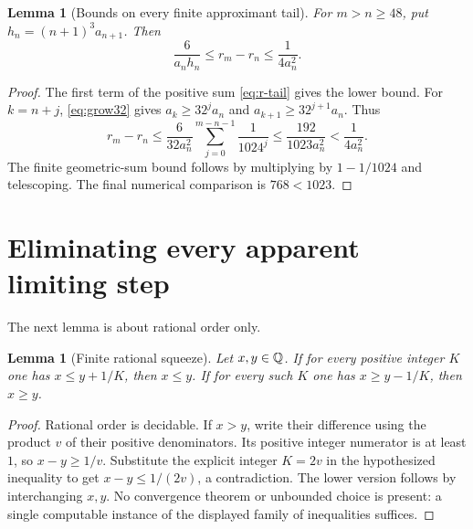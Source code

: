 \documentclass[11pt]{article}
\newtheorem{lemma}[theorem]{Lemma}
\theoremstyle{definition}\newtheorem{definition}[theorem]{Definition}
\theoremstyle{remark}\newtheorem{remark}[theorem]{Remark}
\begin{document}
\begin{lemma}[Bounds on every finite approximant tail]\label{lem:finite-tail}
For $m>n\ge48$, put $h_n=(n+1)^3a_{n+1}$. Then
\begin{equation}\label{eq:finite-tail-bounds}
 \frac6{a_nh_n}\le r_m-r_n\le\frac1{4a_n^2}.
\end{equation}
\end{lemma}
\begin{proof}
The first term of the positive sum \eqref{eq:r-tail} gives the lower bound.
For $k=n+j$, \eqref{eq:grow32} gives
$a_k\ge32^ja_n$ and $a_{k+1}\ge32^{j+1}a_n$. Thus
\[
 r_m-r_n
 \le\frac6{32a_n^2}\sum_{j=0}^{m-n-1}\frac1{1024^j}
 \le\frac{192}{1023a_n^2}<\frac1{4a_n^2}.
\]
The finite geometric-sum bound follows by multiplying by $1-1/1024$ and
telescoping. The final numerical comparison is $768<1023$.
\end{proof}

\section{Eliminating every apparent limiting step}\label{sec:squeeze}
The next lemma is about rational order only.

\begin{lemma}[Finite rational squeeze]\label{lem:squeeze}
Let $x,y\in\mathbb Q$. If for every positive integer $K$ one has
$x\le y+1/K$, then $x\le y$. If for every such $K$ one has
$x\ge y-1/K$, then $x\ge y$.
\end{lemma}
\begin{proof}
Rational order is decidable. If $x>y$, write their difference using the
product $v$ of their positive denominators. Its positive integer numerator
is at least $1$, so $x-y\ge1/v$. Substitute the explicit integer $K=2v$ in
the hypothesized inequality to get $x-y\le1/(2v)$, a contradiction.
The lower version follows by interchanging $x,y$.
No convergence theorem or unbounded choice is present: a single computable
instance of the displayed family of inequalities suffices.
\end{proof}
\end{document}
